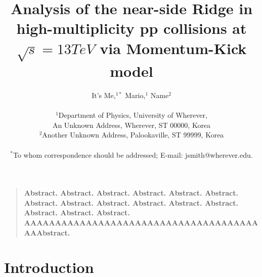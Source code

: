 \documentclass[12pt]{article}
\title{Analysis of the near-side Ridge in high-multiplicity pp collisions at $\sqrt{s}=13TeV$ via Momentum-Kick model}
\author
{It's Me,$^{1\ast}$ Mario,$^{1}$ Name$^{2}$\\
\\
\normalsize{$^{1}$Department of Physics, University of Wherever,}\\
\normalsize{An Unknown Address, Wherever, ST 00000, Korea}\\
\normalsize{$^{2}$Another Unknown Address, Palookaville, ST 99999, Korea}\\
\\
\normalsize{$^\ast$To whom correspondence should be addressed; E-mail:  jsmith@wherever.edu.}
}
\date{}
\newenvironment{sciabstract}{
\begin{quote} \bf}
{\end{quote}}
\begin{document}
 


\baselineskip24pt


\maketitle 



\begin{sciabstract}
  Abstract. Abstract. Abstract. Abstract. Abstract. Abstract. Abstract. Abstract. Abstract. Abstract. Abstract. Abstract. Abstract. Abstract. Abstract.
  AAAAAAAAAAAAAAAAAAAAAAAAAAAAAAAAAAAAAAAAAbstract.
\end{sciabstract}




\section*{Introduction}
\end{document}
